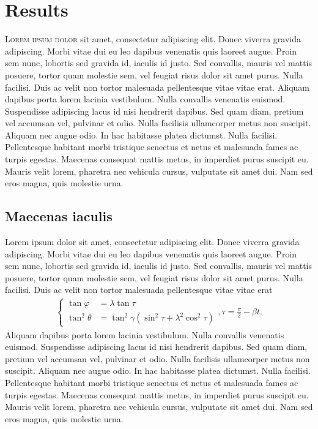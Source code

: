 \chapter{Results}
\lettrine[lines=4, loversize=-0.1, lraise=0.1]{L}{orem ipsum dolor} sit amet, consectetur adipiscing elit. Donec viverra gravida adipiscing. Morbi vitae dui eu leo dapibus venenatis quis laoreet augue. Proin sem nunc, lobortis sed gravida id, iaculis id justo. Sed convallis, mauris vel mattis posuere, tortor quam molestie sem, vel feugiat risus dolor sit amet purus. Nulla facilisi. Duis ac velit non tortor malesuada pellentesque vitae vitae erat. Aliquam dapibus porta lorem lacinia vestibulum. Nulla convallis venenatis euismod. Suspendisse adipiscing lacus id nisi hendrerit dapibus. Sed quam diam, pretium vel accumsan vel, pulvinar et odio. Nulla facilisis ullamcorper metus non suscipit. Aliquam nec augue odio. In hac habitasse platea dictumst. Nulla facilisi. Pellentesque habitant morbi tristique senectus et netus et malesuada fames ac turpis egestas. Maecenas consequat mattis metus, in imperdiet purus suscipit eu. Mauris velit lorem, pharetra nec vehicula cursus, vulputate sit amet dui. Nam sed eros magna, quis molestie urna.
\section{Maecenas iaculis}
Lorem ipsum dolor sit amet, consectetur adipiscing elit. Donec viverra gravida adipiscing. Morbi vitae dui eu leo dapibus venenatis quis laoreet augue. Proin sem nunc, lobortis sed gravida id, iaculis id justo. Sed convallis, mauris vel mattis posuere, tortor quam molestie sem, vel feugiat risus dolor sit amet purus. Nulla facilisi. Duis ac velit non tortor malesuada pellentesque vitae vitae erat
\begin{gather*}
\left\{\begin{split}
\tan \varphi &= \lambda \tan \tau \\
\tan^2 \theta &= \tan^2 \gamma (\sin^2\tau + \lambda^2 \cos^2\tau)
\end{split}\right., \tau = \frac{\pi}{2}-\beta t.
\end{gather*}
Aliquam dapibus porta lorem lacinia vestibulum. Nulla convallis venenatis euismod. Suspendisse adipiscing lacus id nisi hendrerit dapibus. Sed quam diam, pretium vel accumsan vel, pulvinar et odio. Nulla facilisis ullamcorper metus non suscipit. Aliquam nec augue odio. In hac habitasse platea dictumst. Nulla facilisi. Pellentesque habitant morbi tristique senectus et netus et malesuada fames ac turpis egestas. Maecenas consequat mattis metus, in imperdiet purus suscipit eu. Mauris velit lorem, pharetra nec vehicula cursus, vulputate sit amet dui. Nam sed eros magna, quis molestie urna.

